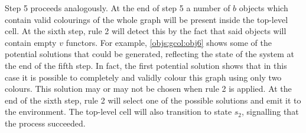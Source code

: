 Step 5 proceeds analogously.  At the end of step 5 a number of \(b\) objects which contain valid colourings of the whole graph will be present inside the top-level cell.  At the sixth step, rule 2 will detect this by the fact that said objects will contain empty \(v\) functors.  For example, \autoref{objs:gcol:obj6} shows some of the potential solutions that could be generated, reflecting the state of the system at the end of the fifth step.  In fact, the first potential solution shows that in this case it is possible to completely and validly colour this graph using only two colours.  This solution may or may not be chosen when rule 2 is applied.  At the end of the sixth step, rule 2 will select one of the possible solutions and emit it to the environment.  The top-level cell will also transition to state \(s_2\), signalling that the process succeeded.


